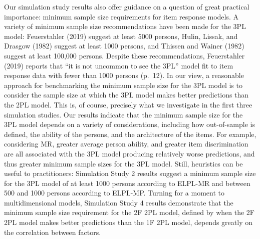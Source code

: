 \documentclass[
  english,
  man,floatsintext]{apa7}
\begin{document}
Our simulation study results also offer guidance on a question of great practical importance: minimum sample size requirements for item response models. A variety of minimum sample size recommendations have been made for the 3PL model: Feuerstahler (2019) suggest at least 5000 persons, Hulin, Lissak, and Drasgow (1982) suggest at least 1000 persons, and Thissen and Wainer (1982) suggest at least 100,000 persons. Despite these recommendations, Feuerstahler (2019) reports that ``it is not uncommon to see the 3PL'' model fit to item response data with fewer than 1000 persons (p.~12). In our view, a reasonable approach for benchmarking the minimum sample size for the 3PL model is to consider the sample size at which the 3PL model makes better predictions than the 2PL model. This is, of course, precisely what we investigate in the first three simulation studies. Our results indicate that the minimum sample size for the 3PL model depends on a variety of considerations, including how out-of-sample is defined, the ability of the persons, and the architecture of the items. For example, considering MR, greater average person ability, and greater item discrimination are all associated with the 3PL model producing relatively worse predictions, and thus greater minimum sample sizes for the 3PL model. Still, heuristics can be useful to practitioners: Simulation Study 2 results suggest a minimum sample size for the 3PL model of at least 1000 persons according to ELPL-MR and between 500 and 1000 persons according to ELPL-MP. Turning for a moment to multidimensional models, Simulation Study 4 results demonstrate that the minimum sample size requirement for the 2F 2PL model, defined by when the 2F 2PL model makes better predictions than the 1F 2PL model, depends greatly on the correlation between factors.
\end{document}
